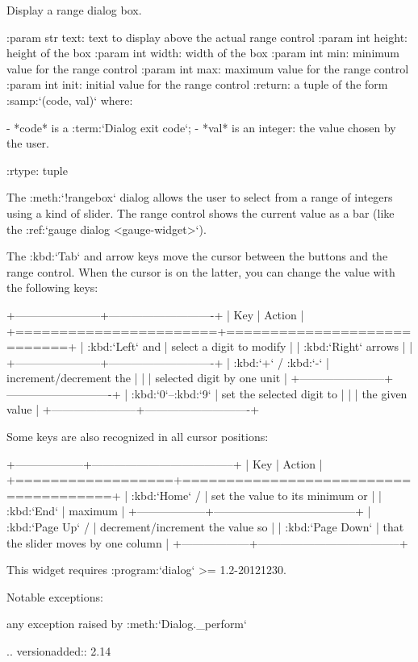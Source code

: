 \begin{DoxyVerb}Display a range dialog box.

:param str text:   text to display above the actual range control
:param int height: height of the box
:param int width:  width of the box
:param int min:    minimum value for the range control
:param int max:    maximum value for the range control
:param int init:   initial value for the range control
:return: a tuple of the form :samp:`({code}, {val})` where:

  - *code* is a :term:`Dialog exit code`;
  - *val* is an integer: the value chosen by the user.

:rtype: tuple

The :meth:`!rangebox` dialog allows the user to select from a
range of integers using a kind of slider. The range control
shows the current value as a bar (like the :ref:`gauge dialog
<gauge-widget>`).

The :kbd:`Tab` and arrow keys move the cursor between the
buttons and the range control. When the cursor is on the latter,
you can change the value with the following keys:

+-----------------------+----------------------------+
|          Key          |           Action           |
+=======================+============================+
| :kbd:`Left` and       | select a digit to modify   |
| :kbd:`Right` arrows   |                            |
+-----------------------+----------------------------+
| :kbd:`+` / :kbd:`-`   | increment/decrement the    |
|                       | selected digit by one unit |
+-----------------------+----------------------------+
| :kbd:`0`–:kbd:`9`     | set the selected digit to  |
|                       | the given value            |
+-----------------------+----------------------------+

Some keys are also recognized in all cursor positions:

+------------------+--------------------------------------+
|       Key        |                Action                |
+==================+======================================+
| :kbd:`Home` /    | set the value to its minimum or      |
| :kbd:`End`       | maximum                              |
+------------------+--------------------------------------+
| :kbd:`Page Up` / | decrement/increment the value so     |
| :kbd:`Page Down` | that the slider moves by one column  |
+------------------+--------------------------------------+

This widget requires :program:`dialog` >= 1.2-20121230.

Notable exceptions:

  any exception raised by :meth:`Dialog._perform`

.. versionadded:: 2.14\end{DoxyVerb}
